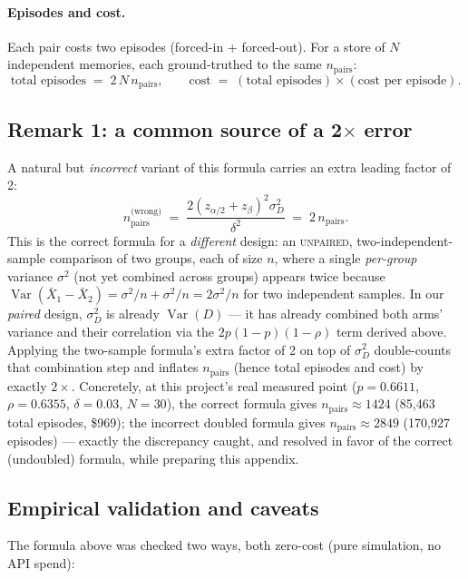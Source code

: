 \paragraph{Episodes and cost.} Each pair costs two episodes (forced-in +
forced-out). For a store of $N$ independent memories, each ground-truthed to
the same $n_{\text{pairs}}$:
\[
  \text{total episodes} \;=\; 2 \, N \, n_{\text{pairs}},
  \qquad
  \text{cost} \;=\; (\text{total episodes}) \times (\text{cost per episode}).
\]

\subsection*{Remark 1: a common source of a 2$\times$ error}
\label{rem:factor-of-two}

A natural but \emph{incorrect} variant of this formula carries an extra
leading factor of 2:
\[
  n_{\text{pairs}}^{\text{(wrong)}} \;=\; \frac{2\left(z_{\alpha/2}+z_\beta\right)^2 \sigma_D^2}{\delta^2}
  \;=\; 2\, n_{\text{pairs}}.
\]
This is the correct formula for a \emph{different} design: an
\textsc{unpaired}, two-independent-sample comparison of two groups, each of
size $n$, where a single \emph{per-group} variance $\sigma^2$ (not yet
combined across groups) appears twice because
$\operatorname{Var}(\bar X_1 - \bar X_2) = \sigma^2/n + \sigma^2/n =
2\sigma^2/n$ for two independent samples. In our \emph{paired} design,
$\sigma_D^2$ is already $\operatorname{Var}(D)$ — it has already combined
both arms' variance and their correlation via the $2p(1-p)(1-\rho)$ term
derived above. Applying the two-sample formula's extra factor of 2 on top of
$\sigma_D^2$ double-counts that combination step and inflates
$n_{\text{pairs}}$ (hence total episodes and cost) by exactly $2\times$.
Concretely, at this project's real measured point ($p=0.6611$,
$\rho=0.6355$, $\delta=0.03$, $N=30$), the correct formula gives
$n_{\text{pairs}}\approx1424$ (85{,}463 total episodes, \$969); the
incorrect doubled formula gives $n_{\text{pairs}}\approx2849$ (170{,}927
episodes) — exactly the discrepancy caught, and resolved in favor of the
correct (undoubled) formula, while preparing this appendix.

\subsection{Empirical validation and caveats}
\label{sec:power-caveats}

The formula above was checked two ways, both zero-cost (pure simulation,
no API spend):

